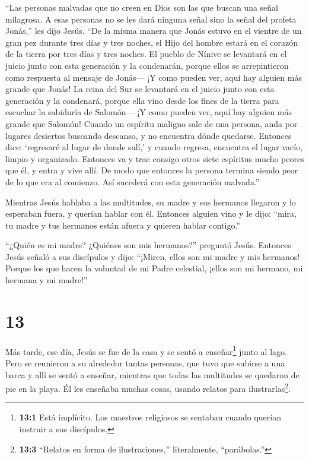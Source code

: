  ``Las personas malvadas que no creen en Dios son las que
buscan una señal milagrosa. A esas personas no se les dará ninguna señal
sino la señal del profeta Jonás,'' les dijo Jesús.  ``De la
misma manera que Jonás estuvo en el vientre de un gran pez durante tres
días y tres noches, el Hijo del hombre estará en el corazón de la tierra
por tres días y tres noches.  El pueblo de Nínive se
levantará en el juicio junto con esta generación y la condenarán, porque
ellos se arrepintieron como respuesta al mensaje de Jonás--- ¡Y como
pueden ver, aquí hay alguien más grande que Jonás!  La
reina del Sur se levantará en el juicio junto con esta generación y la
condenará, porque ella vino desde los fines de la tierra para escuchar
la sabiduría de Salomón--- ¡Y como pueden ver, aquí hay alguien más
grande que Salomón!  Cuando un espíritu maligno sale de una
persona, anda por lugares desiertos buscando descanso, y no encuentra
dónde quedarse.  Entonces dice: `regresaré al lugar de
donde salí,' y cuando regresa, encuentra el lugar vacío, limpio y
organizado.  Entonces va y trae consigo otros siete
espíritus mucho peores que él, y entra y vive allí. De modo que entonces
la persona termina siendo peor de lo que era al comienzo. Así sucederá
con esta generación malvada.''

 Mientras Jesús hablaba a las multitudes, su madre y sus
hermanos llegaron y lo esperaban fuera, y querían hablar con él.
 Entonces alguien vino y le dijo: ``mira, tu madre y tus
hermanos están afuera y quieren hablar contigo.''

 ``¿Quién es mi madre? ¿Quiénes son mis hermanos?''
preguntó Jesús.  Entonces Jesús señaló a sus discípulos y
dijo: ``¡Miren, ellos son mi madre y mis hermanos!  Porque
los que hacen la voluntad de mi Padre celestial, ¡ellos son mi hermano,
mi hermana y mi madre!''

\hypertarget{section-12}{%
\section{13}\label{section-12}}

 Más tarde, ese día, Jesús se fue de la casa y se sentó a
enseñar\footnote{\textbf{13:1} Está implícito. Los maestros religiosos
  se sentaban cuando querían instruir a sus discípulos.} junto al lago.
 Pero se reunieron a su alrededor tantas personas, que tuvo
que subirse a una barca y allí se sentó a enseñar, mientras que todas
las multitudes se quedaron de pie en la playa.  Él les
enseñaba muchas cosas, usando relatos para ilustrarlas\footnote{\textbf{13:3}
  ``Relatos en forma de ilustraciones,'' literalmente, ``parábolas.''}.

